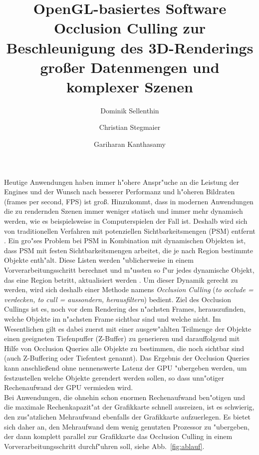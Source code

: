 \documentclass[journal]{vgtc}
\author{Dominik Sellenthin \and Christian Stegmaier \and Gariharan Kanthasamy}
\title{OpenGL-basiertes Software Occlusion Culling zur Beschleunigung des 3D-Renderings gro{\ss}er Datenmengen und komplexer Szenen}
\begin{document}


\maketitle

Heutige Anwendungen haben immer h"ohere Anspr"uche an die Leistung der Engines und der Wunsch nach besserer Performanz und h"oheren Bildraten (frames per second, FPS) ist gro{\ss}.
Hinzukommt, dass in modernen Anwendungen die zu rendernden Szenen immer weniger statisch und immer mehr dynamisch werden, wie es beispielsweise in Computerspielen der Fall ist.
Deshalb wird sich von traditionellen Verfahren mit potenziellen Sichtbarkeitsmengen (PSM) entfernt \cite{MSOC}. Ein gro"ses Problem bei PSM in Kombination mit dynamischen Objekten ist, dass PSM mit festen Sichtbarkeitsmengen arbeitet, die je nach Region bestimmte Objekte enth"alt. Diese Listen werden "ublicherweise in einem Vorverarbeitungsschritt berechnet und m"ussten so f"ur jedes dynamische Objekt, das eine Region betritt, aktualisiert werden \cite{PVS}.
Um dieser Dynamik gerecht zu werden, wird sich deshalb einer Methode namens \textit{Occlusion Culling} (\textit{to occlude = verdecken, to cull = aussondern, herausfiltern}) bedient.
Ziel des Occlusion Cullings ist es, noch vor dem Rendering des n"achsten Frames, herauszufinden, welche Objekte im n"achsten Frame sichtbar sind und welche nicht.
Im Wesentlichen gilt es dabei zuerst mit einer ausgew"ahlten Teilmenge der Objekte einen geeigneten Tiefenpuffer (Z-Buffer) zu generieren und darauffolgend mit Hilfe von Occlusion Queries alle Objekte zu bestimmen, die noch sichtbar sind (auch Z-Buffering oder Tiefentest genannt).
Das Ergebnis der Occlusion Queries kann anschlie{\ss}end ohne nennenswerte Latenz der GPU "ubergeben werden, um festzustellen welche Objekte gerendert werden sollen, so dass unn"otiger Rechenaufwand der GPU vermieden wird.\\

Bei Anwendungen, die ohnehin schon enormen Rechenaufwand ben"otigen und die maximale Rechenkapazit"at der Grafikkarte schnell ausreizen, ist es schwierig, den zus"atzlichen Mehraufwand ebenfalls der Grafikkarte aufzuerlegen.
Es bietet sich daher an, den Mehraufwand dem wenig genutzten Prozessor zu "ubergeben, der dann komplett parallel zur Grafikkarte das Occlusion Culling in einem Vorverarbeitungsschritt durchf"uhren soll, siehe Abb.\ \ref{fig:ablauf}.
\end{document}
